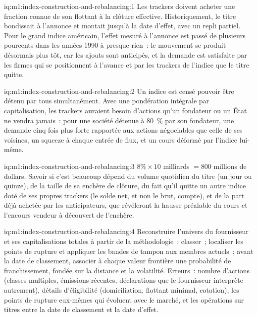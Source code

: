 \begin{solution}{iq:m1:index-construction-and-rebalancing:1}
Les trackers doivent acheter une fraction connue de son flottant à la clôture effective.
Historiquement, le titre bondissait à l'annonce et montait jusqu'à la
date d'effet, avec un repli partiel. Pour le grand indice américain, l'effet mesuré
à l'annonce est passé de plusieurs pourcents dans les années 1990 à presque
rien~: le mouvement se produit désormais plus tôt, car les ajouts sont anticipés, et la
demande est satisfaite par les firmes qui se positionnent à l'avance et par les trackers
de l'indice que le titre quitte.
\end{solution}

\begin{solution}{iq:m1:index-construction-and-rebalancing:2}
Un indice est censé pouvoir être détenu par tous simultanément. Avec une pondération
intégrale par capitalisation, les trackers auraient besoin d'actions qu'un fondateur ou un État
ne vendra jamais~: pour une société détenue à 80~\% par son fondateur, une demande
cinq fois plus forte rapportée aux actions négociables que celle de ses voisines, un squeeze à
chaque entrée de flux, et un cours déformé par l'indice lui-même.
\end{solution}

\begin{solution}{iq:m1:index-construction-and-rebalancing:3}
$8\% \times 10$ milliards $= 800$ millions de dollars. Savoir si c'est beaucoup dépend du
volume quotidien du titre (un jour ou quinze), de la taille de sa
enchère de clôture, du fait qu'il quitte un autre indice doté de ses propres trackers (le
solde net, et non le brut, compte), et de la part déjà achetée par les anticipateurs, que
révéleront la hausse préalable du cours et l'encours vendeur à découvert de
l'enchère.
\end{solution}

\begin{solution}{iq:m1:index-construction-and-rebalancing:4}
Reconstruire l'univers du fournisseur et ses capitalisations totales à partir de la
méthodologie~; classer~; localiser les points de rupture et appliquer les bandes de tampon aux
membres actuels~; avant la date de classement, associer à chaque valeur frontière une
probabilité de franchissement, fondée sur la distance et la volatilité. Erreurs~: nombre d'actions (classes multiples,
émissions récentes, déclarations que le fournisseur interprète autrement), détails d'éligibilité
(domiciliation, flottant minimal, cotation), les points de rupture eux-mêmes qui évoluent avec
le marché, et les opérations sur titres entre la date de classement et la date d'effet.
\end{solution}

